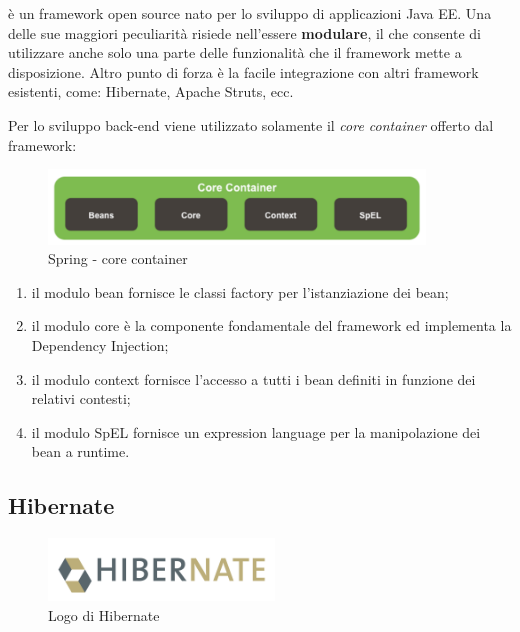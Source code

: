 \ap{{[b]}} è un framework open source nato per lo sviluppo di applicazioni Java EE. Una delle sue maggiori peculiarità risiede nell'essere \textbf{modulare}, il che consente di utilizzare anche solo una parte delle funzionalità che il framework mette a disposizione. Altro punto di forza è la facile integrazione con altri framework esistenti, come: Hibernate, Apache Struts, ecc. 

\setlength{\parskip}{3ex}

\noindent Per lo sviluppo back-end viene utilizzato solamente il  \textit{core container} offerto dal framework:

\begin{figure}[!h]
	\centering
	\includegraphics[width=10cm]{../images/Spring-core.png}
	\caption{Spring - core container}
\end{figure}

\begin{enumerate}
\item il modulo bean fornisce le classi factory per l’istanziazione dei bean;
\item il modulo core è la componente fondamentale del framework ed implementa la Dependency Injection;
\item il modulo context fornisce l’accesso a tutti i bean definiti in funzione dei relativi contesti;
\item il modulo SpEL fornisce un expression language per la manipolazione dei bean a runtime.
\end{enumerate}

\pagebreak

\subsection{Hibernate}

\begin{figure}[!h]
	\centering
	\includegraphics[width=6cm]{../images/Hibernate-logo.png}
	\caption{Logo di Hibernate}
\end{figure}

